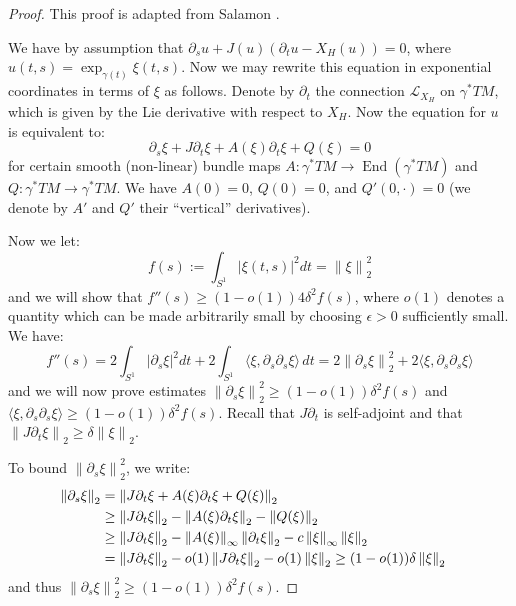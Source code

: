 \documentclass[12pt]{article}
\theoremstyle{definition}
\theoremstyle{remark}
\numberwithin{equation}{subsection}
\begin{document}
\begin{proof}
This proof is adapted from Salamon \cite[p170, Lemma 2.11]{salamonnotes}.

We have by assumption that $\partial_su+J(u)(\partial_tu-X_H(u))=0$, where $u(t,s)=\exp_{\gamma(t)}\xi(t,s)$.  Now we may rewrite this equation in exponential coordinates in terms of $\xi$ as follows.  Denote by $\partial_t$ the connection $\mathcal L_{X_H}$ on $\gamma^\ast TM$, which is given by the Lie derivative with respect to $X_H$.  Now the equation for $u$ is equivalent to:
\begin{equation}
\partial_s\xi+J\partial_t\xi+A(\xi)\partial_t\xi+Q(\xi)=0
\end{equation}
for certain smooth (non-linear) bundle maps $A:\gamma^\ast TM\to\operatorname{End}(\gamma^\ast TM)$ and $Q:\gamma^\ast TM\to\gamma^\ast TM$.  We have $A(0)=0$, $Q(0)=0$, and $Q'(0,\cdot)=0$ (we denote by $A'$ and $Q'$ their ``vertical'' derivatives).

Now we let:
\begin{equation}
f(s):=\int_{S^1}\left|\xi(t,s)\right|^2dt=\left\|\xi\right\|_2^2
\end{equation}
and we will show that $f''(s)\geq(1-o(1))4\delta^2f(s)$, where $o(1)$ denotes a quantity which can be made arbitrarily small by choosing $\epsilon>0$ sufficiently small.  We have:
\begin{equation}\label{fppexpr}
f''(s)=2\int_{S^1}\left|\partial_s\xi\right|^2dt+2\int_{S^1}\langle\xi,\partial_s\partial_s\xi\rangle\,dt=2\left\|\partial_s\xi\right\|_2^2+2\langle\xi,\partial_s\partial_s\xi\rangle
\end{equation}
and we will now prove estimates $\left\|\partial_s\xi\right\|_2^2\geq(1-o(1))\delta^2f(s)$ and $\langle\xi,\partial_s\partial_s\xi\rangle\geq(1-o(1))\delta^2f(s)$.  Recall that $J\partial_t$ is self-adjoint and that $\left\|J\partial_t\xi\right\|_2\geq\delta\left\|\xi\right\|_2$.

To bound $\left\|\partial_s\xi\right\|_2^2$, we write:
\begin{align}
\left\|\partial_s\xi\right\|_2&=\left\|J\partial_t\xi+A(\xi)\partial_t\xi+Q(\xi)\right\|_2\cr
&\geq\left\|J\partial_t\xi\right\|_2-\left\|A(\xi)\partial_t\xi\right\|_2-\left\|Q(\xi)\right\|_2\cr
&\geq\left\|J\partial_t\xi\right\|_2-\left\|A(\xi)\right\|_\infty\left\|\partial_t\xi\right\|_2-c\left\|\xi\right\|_\infty\left\|\xi\right\|_2\cr
&=\left\|J\partial_t\xi\right\|_2-o(1)\left\|J\partial_t\xi\right\|_2-o(1)\left\|\xi\right\|_2\geq(1-o(1))\delta\left\|\xi\right\|_2
\end{align}
and thus $\left\|\partial_s\xi\right\|_2^2\geq(1-o(1))\delta^2f(s)$.


\end{proof}
\end{document}
